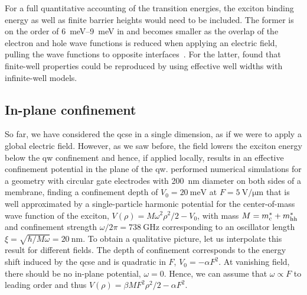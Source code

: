 For a full quantitative accounting of the transition energies, the exciton binding energy as well as finite barrier heights would need to be included.
The former is on the order of \qtyrange{6}{9}{\milli\electronvolt} in  and becomes smaller as the overlap of the electron and hole wave functions is reduced when applying an electric field, pulling the wave functions to opposite interfaces~\cite{Miller1984}.
For the latter, \citet{Miller1985} found that finite-well properties could be reproduced by using effective well widths with infinite-well models.

\subsection{In-plane confinement}\label{subsec:exp:theory:qcse:trap}
So far, we have considered the \gls{qcse} in a single dimension, as if we were to apply a global electric field.
However, as we saw before, the field lowers the exciton energy below the \gls{qw} confinement and hence, if applied locally, results in an effective confinement potential in the plane of the \gls{qw}.
\citet{Descamps2021} performed numerical simulations for a geometry with circular gate electrodes with \qty{200}{\nano\meter} diameter on both sides of a membrane, finding a confinement depth of $V_0 =\qty{20}{\milli\electronvolt}$ at $F=\qty{5}{\volt\per\micro\meter}$ that is well approximated by a single-particle harmonic potential for the center-of-mass wave function of the exciton, $V(\rho) = M\omega^{2}\rho^{2}/2 - V_0$, with mass $M = m^\ast_{\mathrm{c}} + m^\ast_{\mathrm{hh}}$ and confinement strength $\omega/2\pi = \qty{738}{\giga\hertz}$ corresponding to an oscillator length $\xi=\sqrt{\hbar/M\omega}=\qty{20}{\nano\meter}$.
To obtain a qualitative picture, let us interpolate this result for different fields.
The depth of confinement corresponds to the energy shift induced by the \gls{qcse} and is quadratic in $F$, $V_0 = -\alpha F^2$.
At vanishing field, there should be no in-plane potential, $\omega=0$.
Hence, we can assume that $\omega\propto F$ to leading order and thus $V(\rho) = \beta M F^{2} \rho^{2}/2 - \alpha F^{2}$.

